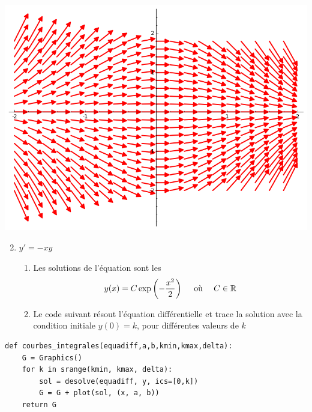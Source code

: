 \begin{frame}

\begin{center}
\includegraphics[scale=0.5]{figures/equadiff-courbe1.png}
\end{center}

\end{frame}



\begin{frame}[fragile] 
 
\begin{enumerate}
  \setcounter{enumi}{1}
  \item $y' = -xy$
  
  \pause
  \begin{enumerate}
    \item Les solutions de l'équation sont les
    $$y(x) = C \exp\left(-\frac{x^2}{2}\right) \quad \text{ où } \quad C \in \mathbb{R}$$
    
    
    \pause
    \item Le code suivant résout l'équation différentielle et trace la solution 
    avec la condition initiale $y(0)=k$, pour différentes valeurs de $k$
  \end{enumerate}
\end{enumerate} 
    
\begin{algo}
\begin{lstlisting}
def courbes_integrales(equadiff,a,b,kmin,kmax,delta):
    G = Graphics()
    for k in srange(kmin, kmax, delta):
        sol = desolve(equadiff, y, ics=[0,k])
        G = G + plot(sol, (x, a, b))
    return G
\end{lstlisting}
\end{algo}      

 
\end{frame}


